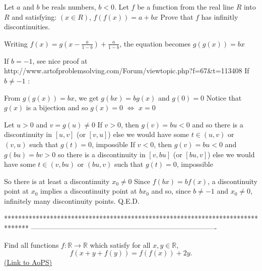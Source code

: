 \begin{solution}
	\begin{tcolorbox}Let $a$ and $b$ be reals numbers, $b<0$. Let $f$ be a function from the real line $R$ into $R$ and satisfying: 
$(x \in R)$,  $f(f(x))=a+bx$
Prove that $f$ has infinitly discontinuities.\end{tcolorbox}
Writing $f(x)=g(x-\frac a{1-b})+\frac a{1-b}$, the equation becomes $g(g(x))=bx$

If $b=-1$, see nice proof at http://www.artofproblemsolving.com/Forum/viewtopic.php?f=67&t=113408
If $b\ne -1$ :

From $g(g(x))=bx$, we get $g(bx)=bg(x)$ and $g(0)=0$
Notice that $g(x)$ is a bijection and so $g(x)=0$ $\iff$ $x=0$

Let $u>0$ and $v=g(u)\ne 0$
If $v>0$, then $g(v)=bu<0$ and so there is a discontinuity in $[u,v]$ (or $[v,u]$) else we would have some $t\in(u,v)$ or $(v,u)$ such that $g(t)=0$, impossible
If $v<0$, then $g(v)=bu<0$ and $g(bu)=bv>0$ so there is a discontinuity in $[v,bu]$ (or $[bu,v]$) else we would have some $t\in(v,bu)$ or $(bu,v)$ such that $g(t)=0$, impossible

So there is at least a discontinuity $x_0\ne 0$
Since $f(bx)=bf(x)$, a discontinuity point at $x_0$ implies a discontinuity point at $bx_0$ and so, since $b\ne -1$ and $x_0\ne 0$, infinitely many discontinuity points.
Q.E.D.
\end{solution}
*******************************************************************************
-------------------------------------------------------------------------------

\begin{problem}
	Find all functions $f: \mathbb R \to \mathbb R$ which satisfy for all $x, y \in \mathbb R$,
\[f(x+y+f(y))=f(f(x))+2y.\]
	\flushright \href{https://artofproblemsolving.com/community/c6h416138}{(Link to AoPS)}
\end{problem}



